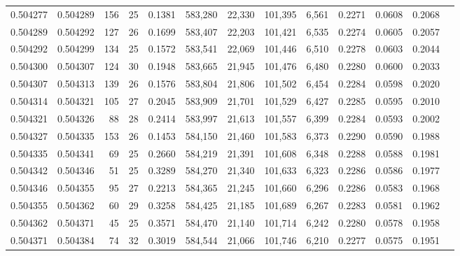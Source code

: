 \begin{tabular}{rrrrrrrrrrrrr}
0.504277 & 0.504289 & 156 &  25 &                                     0.1381 & 583,280 &  22,330 & 101,395 &   6,561 & 0.2271 & 0.0608 & 0.2068 \\
0.504289 & 0.504292 & 127 &  26 &                                     0.1699 & 583,407 &  22,203 & 101,421 &   6,535 & 0.2274 & 0.0605 & 0.2057 \\
0.504292 & 0.504299 & 134 &  25 &                                     0.1572 & 583,541 &  22,069 & 101,446 &   6,510 & 0.2278 & 0.0603 & 0.2044 \\
0.504300 & 0.504307 & 124 &  30 &                                     0.1948 & 583,665 &  21,945 & 101,476 &   6,480 & 0.2280 & 0.0600 & 0.2033 \\
0.504307 & 0.504313 & 139 &  26 &                                     0.1576 & 583,804 &  21,806 & 101,502 &   6,454 & 0.2284 & 0.0598 & 0.2020 \\
0.504314 & 0.504321 & 105 &  27 &                                     0.2045 & 583,909 &  21,701 & 101,529 &   6,427 & 0.2285 & 0.0595 & 0.2010 \\
0.504321 & 0.504326 &  88 &  28 &                                     0.2414 & 583,997 &  21,613 & 101,557 &   6,399 & 0.2284 & 0.0593 & 0.2002 \\
0.504327 & 0.504335 & 153 &  26 &                                     0.1453 & 584,150 &  21,460 & 101,583 &   6,373 & 0.2290 & 0.0590 & 0.1988 \\
0.504335 & 0.504341 &  69 &  25 &                                     0.2660 & 584,219 &  21,391 & 101,608 &   6,348 & 0.2288 & 0.0588 & 0.1981 \\
0.504342 & 0.504346 &  51 &  25 &                                     0.3289 & 584,270 &  21,340 & 101,633 &   6,323 & 0.2286 & 0.0586 & 0.1977 \\
0.504346 & 0.504355 &  95 &  27 &                                     0.2213 & 584,365 &  21,245 & 101,660 &   6,296 & 0.2286 & 0.0583 & 0.1968 \\
0.504355 & 0.504362 &  60 &  29 &                                     0.3258 & 584,425 &  21,185 & 101,689 &   6,267 & 0.2283 & 0.0581 & 0.1962 \\
0.504362 & 0.504371 &  45 &  25 &                                     0.3571 & 584,470 &  21,140 & 101,714 &   6,242 & 0.2280 & 0.0578 & 0.1958 \\
0.504371 & 0.504384 &  74 &  32 &                                     0.3019 & 584,544 &  21,066 & 101,746 &   6,210 & 0.2277 & 0.0575 & 0.1951 \\

\end{tabular}
